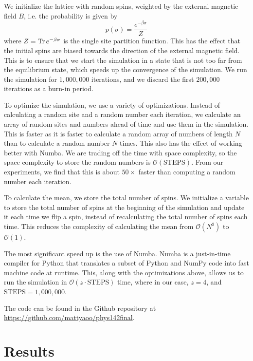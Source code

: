 \documentclass[
 reprint,
 amsmath,
 amssymb,
 aps,
]{revtex4-2}
\begin{document}
We initialize the lattice with random spins, weighted by 
the external magnetic field $ B $, i.e.
the probability is given by 
\begin{equation}
p(\sigma) = \frac{e^{-\beta \sigma}}{Z}
\end{equation}
where $ Z = \Tr e^{-\beta \sigma} $ is the single site partition function.
This has the effect that the initial spins are 
biased towards the direction of the external magnetic field.
This is to ensure that we start the simulation in a state that is not too far
from the equilibrium state, which speeds up the convergence of the simulation.
We run the simulation for $ 1,000,000 $ iterations,
and we discard the first $ 200,000 $ iterations as a burn-in period.

To optimize the simulation, we use a variety of optimizations.
Instead of calculating a random site and a random number each iteration,
we calculate an array of random sites and numbers ahead of time and
use them in the simulation.
This is faster as it is faster to calculate a random array of numbers of length
$ N $ than to calculate a random number $ N $ times.
This also has the effect of working better with Numba.
We are trading off the time with space complexity,
so the space complexity to store the random numbers is 
$ \mathcal{O}(\mathrm{STEPS}) $.
From our experiments, we find that this is about $ 50\times $ faster than
computing a random number each iteration.

To calculate the mean, we store the total number of spins.
We initialize a variable to store the total number of spins at the beginning
of the simulation and update it each time we flip a spin,
instead of recalculating the total number of spins each time.
This reduces the complexity of calculating the mean from 
$ \mathcal{O}(N^{2}) $ to $ \mathcal{O}(1) $.

The most significant speed up is the use of Numba. Numba is a
just-in-time compiler for Python that translates a subset of Python and NumPy
code into fast machine code at runtime.
This, along with the optimizations above, allows us to run the simulation
in $ \mathcal{O}(z\cdot \mathrm{STEPS}) $ time, 
where in our case, $ z = 4 $, and $ \mathrm{STEPS} = 1,000,000 $.

The code can be found in the Github repository at 
\url{https://github.com/mattyaoo/phys142final}.

\section{Results}
\label{sec:results}
\end{document}
